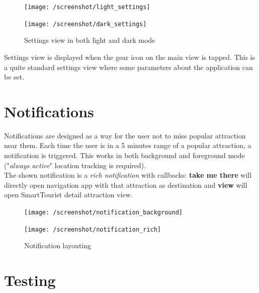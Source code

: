 \documentclass[a4paper, 11pt, parskip=half]{scrreprt}
\theoremstyle{definition}
\begin{document}
\begin{figure}[H]
	\centering
	\begin{minipage}{.5\textwidth}
  	\centering
  	\texttt{[image: /screenshot/light\_settings]}
  	\label{fig:test1}
	\end{minipage}%
	\begin{minipage}{.5\textwidth}
  	\centering
  	\texttt{[image: /screenshot/dark\_settings]}
  	\label{fig:test2}
	\end{minipage}
	\caption{Settings view in both light and dark mode}
\end{figure}

Settings view is displayed when the gear icon on the main view is tapped. This is a quite standard settings view where some parameters about the application can be set.




\chapter{Notifications}

Notifications are designed as a way for the user not to miss popular attraction near them. Each time the user is in a 5 minutes range of a popular attraction, a notification is triggered. This works in both background and foreground mode ("\textit{always active}" location tracking is required).
\\The shown notification is a \textit{rich notification} with callbacks: \textbf{take me there} will directly open navigation app with that attraction as destination and \textbf{view} will open SmartTourist detail attraction view.

\begin{figure}[H]
	\centering
	\begin{minipage}{.5\textwidth}
  	\centering
  	\texttt{[image: /screenshot/notification\_background]}
  	\label{fig:test1}
	\end{minipage}%
	\begin{minipage}{.5\textwidth}
  	\centering
  	\texttt{[image: /screenshot/notification\_rich]}
  	\label{fig:test2}
	\end{minipage}
	\caption{Notification layouting}
\end{figure}




\chapter{Testing}
\end{document}
